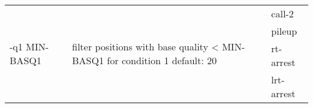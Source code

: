 {\small
\begin{tabular}{@{}p{}p{}l@{}}
\multirow{4}{=}{-q1 MIN-BASQ1} & \multirow{4}{=}{filter positions with base quality < MIN-BASQ1 for condition 1
 default: 20} & call-2 \\
 &  & pileup \\
 &  & rt-arrest \\
 &  & lrt-arrest \\
\end{tabular}\\
}
